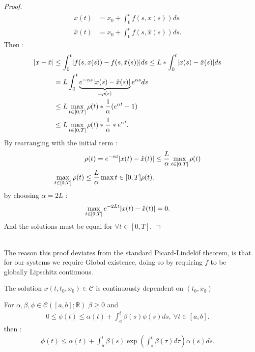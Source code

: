 \begin{proof}[Proof]
\begin{align*}
   x(t) &= x_0 + \int_0^{t} f(s,x(s)) ds \\
   \hat{x}(t) &= x_0 + \int_0^{t} f(s,\hat{x}(s) ) ds  
 .\end{align*}
 Then : 
 \begin{align*}
   \lvert x - \hat{x} \rvert &\le  \int_0^{t} \lvert f(s,x(s))-f(s,\hat{x}(s) )\rvert ds \le  L * \int_0^{t} \lvert x(s) - \hat{x}(s) \rvert ds  \\
                      &=  L \int_0^{t} \underbrace{e^{-\alpha s} \lvert x(s)-\hat{x}(s) \rvert}_{=\rho(s)} e^{\alpha s} ds \\
                      &\le  L \max_{t \in  [0,T]} \rho(t) * \frac{1}{\alpha } (e^{\alpha t} - 1) \\
                      &\le  L \max_{t \in  [0,T]} \rho(t) * \frac{1}{\alpha }* e^{\alpha t} 
 .\end{align*}
By rearranging with the initial term : 
\begin{align*}
  \rho(t) = e^{-\alpha t} \lvert x(t)-\hat{x}(t) \rvert &\le \frac{L}{\alpha } \max_{t \in [0,T]} \rho(t) \\
  \max_{t \in  [0,T]} \rho(t) \le  \frac{L}{\alpha } \max{t \in  [0,T]} \rho(t)
.\end{align*}
by choosing $\alpha = 2L$ : 
\begin{align*}
  \max_{t \in  [0,T]} e^{-2Lt} \lvert x(t)-\hat{x}(t) \rvert = 0 
.\end{align*}
And the solutions must be equal for $\forall  t \in  [0,T]$.
\end{proof}
\hspace{0mm}\\
The reason this proof deviates from the standard Picard-Lindelöf theorem, is that for our systems we require Global existence, doing so by requiring $f$ to be globally Lipschitz continuous.
\begin{theorem}
  The solution $x(t,t_0,x_0) \in  \mathcal{C}$ is continuously dependent on $(t_0,x_0)$
\end{theorem}
\begin{theorem}
  For $\alpha ,\beta ,\phi  \in  \mathcal{C}([a,b];\mathbb{R})$  $\beta \ge 0$ and 
  \begin{align*}
    0\le \phi(t) \le  \alpha(t) + \int_a^{t} \beta(s) \phi(s) ds , \ \forall t \in [a,b]
  .\end{align*}
  then : 
  \begin{align*}
    \phi(t) \le \alpha(t) + \int_{a}^{t} \beta(s) \exp\left(\int_s^{t} \beta(\tau ) d\tau   \right)  \alpha(s) ds
  .\end{align*}
\end{theorem}
